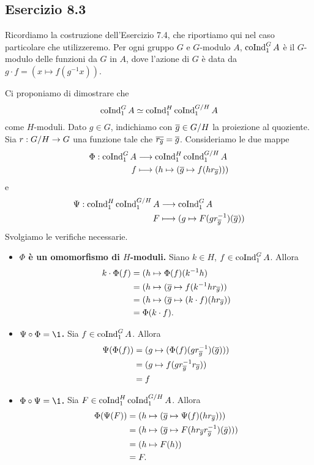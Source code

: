 \documentclass[a4paper]{article}
\begin{document}
\subsection*{Esercizio 8.3}
Ricordiamo la costruzione dell'Esercizio 7.4, che riportiamo qui nel caso particolare che utilizzeremo. Per ogni gruppo $G$ e $G$-modulo $A$, $\operatorname{coInd}_1^GA$ è il $G$-modulo delle funzioni da $G$ in $A$, dove l'azione di $G$ è data da $g\cdot f=(x\mapsto f(g^{-1}x))$.

Ci proponiamo di dimostrare che
$$
\operatorname{coInd}_1^GA\simeq\operatorname{coInd}_1^H\operatorname{coInd}_1^{G/H}A
$$
come $H$-moduli. Dato $g\in G$, indichiamo con $\overline{g}\in G/H$ la proiezione al quoziente. Sia $r:G/H\rightarrow G$ una funzione tale che $\overline{r_{\overline{g}}}=\overline{g}$. Consideriamo le due mappe
\begin{align*}
\Phi:\operatorname{coInd}_1^GA&\longrightarrow\operatorname{coInd}_1^H\operatorname{coInd}_1^{G/H}A\\
f&\longmapsto(h\mapsto(\overline{g}\mapsto f(hr_{\overline{g}})))
\end{align*}
e
\begin{align*}
\Psi:\operatorname{coInd}_1^H\operatorname{coInd}_1^{G/H}A&\longrightarrow\operatorname{coInd}_1^GA\\
F&\longmapsto(g\mapsto F(gr_{\overline{g}}^{-1})(\overline{g}))
\end{align*}
Svolgiamo le verifiche necessarie.
\begin{itemize}
\item \textbf{$\Phi$ è un omomorfismo di $H$-moduli.} Siano $k\in H$, $f\in\operatorname{coInd}_1^GA$. Allora
\begin{align*}
k\cdot\Phi(f)&=(h\mapsto\Phi(f)(k^{-1}h)\\
&=(h\mapsto(\overline{g}\mapsto f(k^{-1}hr_{\overline{g}}))\\
&=(h\mapsto(\overline{g}\mapsto (k\cdot f)(hr_{\overline{g}}))\\
&=\Phi(k\cdot f).
\end{align*}
\item \textbf{$\Psi\circ\Phi=\1$.} Sia $f\in\operatorname{coInd}_1^GA$. Allora
\begin{align*}
\Psi(\Phi(f))&=(g\mapsto(\Phi(f)(gr_{\overline{g}}^{-1})(\overline{g})))\\
&=(g\mapsto f(gr_{\overline{g}}^{-1}r_{\overline{g}}))\\
&=f
\end{align*}
\item \textbf{$\Phi\circ\Psi=\1$.} Sia $F\in\operatorname{coInd}_1^H\operatorname{coInd}_1^{G/H}A$. Allora
\begin{align*}
\Phi(\Psi(F))&=(h\mapsto(\overline{g}\mapsto\Psi(f)(hr_{\overline{g}})))\\
&=(h\mapsto(\overline{g}\mapsto F(hr_{\overline{g}}r_{\overline{g}}^{-1})(\bar{g})))\\
&=(h\mapsto F(h))\\
&=F.
\end{align*}
\end{itemize}
\end{document}
